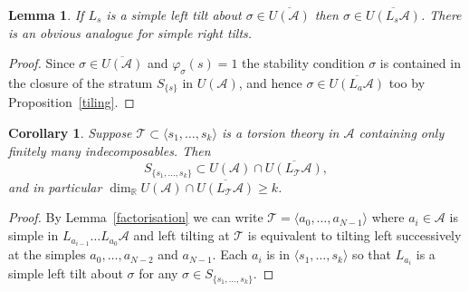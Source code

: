 \documentclass{article}
\theoremstyle{plain}
\newtheorem{lemma}[theorem]{Lemma}     %
\newtheorem{corollary}[theorem]{Corollary}
\theoremstyle{definition}
\theoremstyle{remark}
\newcommand{\R}{\mathbb{R}}
\newcommand{\cat}[1]{\mathcal{#1}}
\begin{document}
\begin{lemma}
If $L_s$ is a simple left tilt about $\sigma\in \overline{U(\cat{A})}$ then $\sigma \in \overline{U(L_s\cat{A})}$. There is an obvious analogue for simple right tilts.
\end{lemma}
\begin{proof}
Since $\sigma \in \overline{U(\cat{A})}$ and $\varphi_\sigma(s)=1$ the stability condition $\sigma$ is contained in the closure of the stratum $S_{\{s\}}$ in $U(\cat{A})$, and hence $\sigma \in \overline{U(L_a\cat{A})}$ too by Proposition~\ref{tiling}. 
\end{proof}
\begin{corollary}
\label{intersection corollary}
Suppose $\cat{T} \subset \langle s_1, \ldots,s_k\rangle$ is a torsion theory in $\cat{A}$ containing only finitely many indecomposables. Then $$S_{\{s_1,\ldots,s_k\}} \subset U(\cat{A}) \cap \overline{U(L_\cat{T}\cat{A})},$$
and in particular $\dim_{\R} U(\cat{A}) \cap \overline{U(L_\cat{T}\cat{A})} \geq k$.
\end{corollary}
\begin{proof}
By Lemma~\ref{factorisation} we can write $\cat{T}=\langle a_0,\ldots,a_{N-1}\rangle$ where $a_i\in \cat{A}$ is simple in $L_{a_{i-1}}\ldots L_{a_0}\cat{A}$ and left tilting at $\cat{T}$ is equivalent to tilting left successively at the simples $a_0,\ldots,a_{N-2}$ and $a_{N-1}$. Each $a_i$ is in $\langle s_1, \ldots,s_k\rangle$ so that $L_{a_i}$ is a simple left tilt about $\sigma$ for any $\sigma\in S_{\{s_1,\ldots,s_k\}}$. 
\end{proof}
\end{document}
